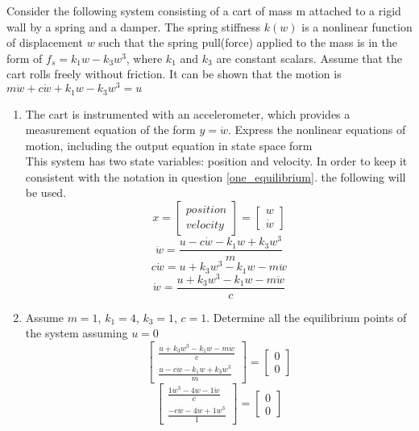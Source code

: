 
\item Consider the following system consisting of a cart of mass m attached to a rigid wall by a spring and a
damper. The spring stiffness $k(w)$ is a nonlinear function of displacement $w$ such that the spring pull(force)
applied to the mass is in the form of $f_s = k_1w - k_3w^3$, where $k_1$ and $k_3$ are constant scalars. Assume
that the cart rolls freely without friction. It can be shown that the motion is
$m\ddot w + c\dot w + k_1w - k_3w^3 = u$
\begin{enumerate}
\item The cart is instrumented with an accelerometer, which provides a measurement equation of the form
  $y = \ddot w$. Express the nonlinear equations of motion, including the output equation in state space form\\
  This system has two state variables: position and velocity. In order to keep it consistent with the notation
  in question \ref{one_equilibrium}. the following will be used.
  \begin{equation}
    x =
    \begin{bmatrix}
      position \\
      velocity
    \end{bmatrix} =
    \begin{bmatrix}
      w \\
      \dot w
    \end{bmatrix}
  \end{equation}
  \begin{equation}
    \ddot w = \frac{u - c\dot w - k_1w + k_3w^3}{m}
  \end{equation}
  \begin{equation}
    c\dot w = u + k_3w^3 - k_1w - m \ddot w
  \end{equation}
  \begin{equation}
    \dot w = \frac{u + k_3w^3 - k_1w - m \ddot w}{c}
  \end{equation}
\item Assume $m = 1$, $k_1 = 4$,
  $k_3 = 1$, $c = 1$. Determine all the
  equilibrium points of the system assuming $u = 0$ \\
  \begin{equation}
    \begin{bmatrix}
      \frac{u + k_3w^3 - k_1w - m \ddot w}{c} \\
      \frac{u - c\dot w - k_1w + k_3w^3}{m}
    \end{bmatrix} =
    \begin{bmatrix}
      0 \\
      0
    \end{bmatrix}
  \end{equation}
  \begin{equation}
    \begin{bmatrix}
      \frac{1w^3 - 4w -  1 \ddot w}{c} \\
      \frac{- c\dot w - 4w + 1w^3}{1}
    \end{bmatrix} =
    \begin{bmatrix}
      0 \\
      0
    \end{bmatrix}
  \end{equation}


\end{enumerate}
